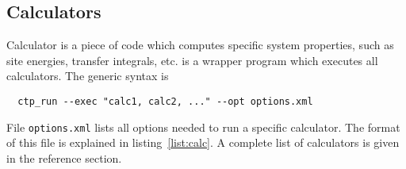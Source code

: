 \subsection{Calculators}
\label{sec:calculators}

Calculator is a piece of code which computes specific system properties, such as site energies, transfer integrals, etc. \ctprun is a wrapper program which executes all calculators. The generic syntax is 
\begin{verbatim}
  ctp_run --exec "calc1, calc2, ..." --opt options.xml
\end{verbatim}
%
File \texttt{options.xml} lists all options needed to run a specific calculator. The format of this file is explained in listing~\ref{list:calc}. A complete list of calculators is given in the  reference section.
%

